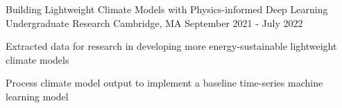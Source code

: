 \documentclass[12pt, letterpaper]{awesome-cv}
\begin{document}
\begin{cventries}
  \cventry
    {Building Lightweight Climate Models with Physics-informed Deep Learning } %
    {Undergraduate Research} %
    {Cambridge, MA} %
    {September 2021 - July 2022} %
    {
      \begin{cvitems} %
        \item {Extracted data for research in developing more energy-sustainable lightweight climate models}
        \item {Process climate model output to implement a baseline time-series machine learning model}
      \end{cvitems}
    }


  \end{cventries} 


\end{document}
